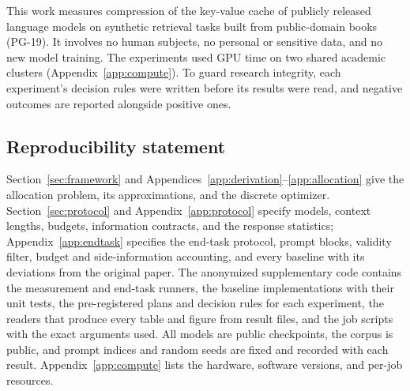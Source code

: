 \documentclass{article}
\newif\ifshowest \showesttrue
\DeclareRobustCommand{\estonly}[1]{\ifshowest#1\else\ifhmode\unskip\fi\fi}
\theoremstyle{definition}
\begin{document}
This work measures compression of the key-value cache of publicly released language models on synthetic retrieval tasks built from public-domain books (PG-19).  It involves no human subjects, no personal or sensitive data, and no new model training.  The experiments used GPU time on two shared academic clusters (Appendix~\ref{app:compute}).  To guard research integrity, each experiment's decision rules were written before its results were read, and negative outcomes are reported alongside positive ones. %

\subsection*{Reproducibility statement}

Section~\ref{sec:framework} and Appendices~\ref{app:derivation}--\ref{app:allocation} give the allocation problem, its approximations, and the discrete optimizer.  Section~\ref{sec:protocol} and Appendix~\ref{app:protocol} specify models, context lengths, budgets, information contracts, and the response statistics; Appendix~\ref{app:endtask} specifies the end-task protocol, prompt blocks, validity filter, budget and side-information accounting, and every baseline with its deviations from the original paper.  The anonymized supplementary code contains the measurement and end-task runners, the baseline implementations with their unit tests, the pre-registered plans and decision rules for each experiment, the readers that produce every table and figure from result files, and the job scripts with the exact arguments used.  All models are public checkpoints, the corpus is public, and prompt indices and random seeds are fixed and recorded with each result.  Appendix~\ref{app:compute} lists the hardware, software versions, and per-job resources.




\clearpage
\appendix

\end{document}
